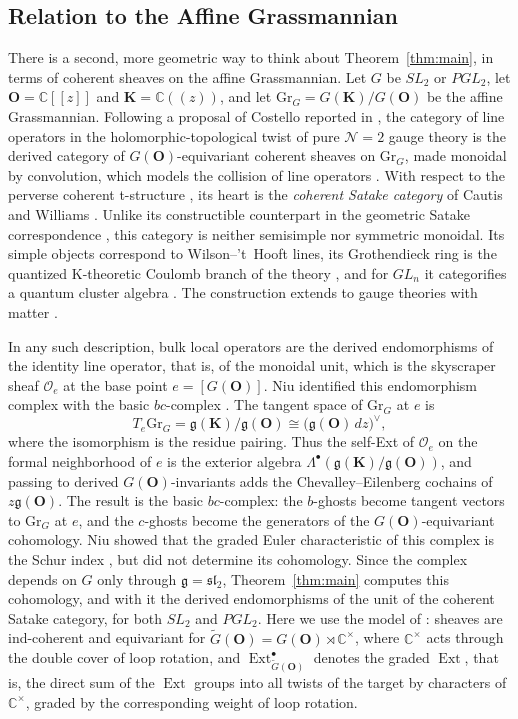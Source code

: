 \documentclass[11pt]{amsart}
\numberwithin{equation}{section}
\renewcommand{\S}{\mbox{$\mathsection$}}
\theoremstyle{definition}
\theoremstyle{remark}
\newcommand{\C}{\mathbb{C}}
\newcommand{\g}{\mathfrak{g}}
\newcommand{\sltwo}{\mathfrak{sl}_2}
\newcommand{\cO}{\mathcal{O}}
\newcommand{\bO}{\mathbf{O}}
\newcommand{\bK}{\mathbf{K}}
\newcommand{\Gr}{\mathrm{Gr}}
\newcommand{\Ext}{\operatorname{Ext}}
\begin{document}
\subsection{Relation to the Affine Grassmannian}\label{subsec:Gr}
There is a second, more geometric way to think about Theorem~\ref{thm:main}, in terms of coherent sheaves on the affine Grassmannian. Let $G$ be $SL_2$ or $PGL_2$, let $\bO=\C[[z]]$ and $\bK=\C((z))$, and let $\Gr_G=G(\bK)/G(\bO)$ be the affine Grassmannian. Following a proposal of Costello reported in \cite{CW19}, the category of line operators in the holomorphic-topological twist \cite{Kap06} of pure $\mathcal N=2$ gauge theory is the derived category of $G(\bO)$-equivariant coherent sheaves on $\Gr_G$, made monoidal by convolution, which models the collision of line operators \cite{KS09}. With respect to the perverse coherent t-structure \cite{AB10,BFM05}, its heart is the \emph{coherent Satake category} of Cautis and Williams \cite{CW19}. Unlike its constructible counterpart in the geometric Satake correspondence \cite{MV07}, this category is neither semisimple nor symmetric monoidal. Its simple objects correspond to Wilson--'t~Hooft lines, its Grothendieck ring is the quantized K-theoretic Coulomb branch of the theory \cite{BFM05,BFN18}, and for $GL_n$ it categorifies a quantum cluster algebra \cite{CW19}. The construction extends to gauge theories with matter \cite{CW23}.

In any such description, bulk local operators are the derived endomorphisms of the identity line operator, that is, of the monoidal unit, which is the skyscraper sheaf $\cO_e$ at the base point $e=[G(\bO)]$. Niu identified this endomorphism complex with the basic $bc$-complex \cite[Theorem~4.13]{Niu22}. The tangent space of $\Gr_G$ at $e$ is
\begin{equation}\label{eq:tangent}
T_e\Gr_G=\g(\bK)/\g(\bO)\cong\bigl(\g(\bO)\,dz\bigr)^\vee,
\end{equation}
where the isomorphism is the residue pairing. Thus the self-Ext of $\cO_e$ on the formal neighborhood of $e$ is the exterior algebra $\Lambda^\bullet(\g(\bK)/\g(\bO))$, and passing to derived $G(\bO)$-invariants adds the Chevalley--Eilenberg cochains of $z\g(\bO)$. The result is the basic $bc$-complex: the $b$-ghosts become tangent vectors to $\Gr_G$ at $e$, and the $c$-ghosts become the generators of the $G(\bO)$-equivariant cohomology. Niu showed that the graded Euler characteristic of this complex is the Schur index \cite{Niu22}, but did not determine its cohomology. Since the complex depends on $G$ only through $\g=\sltwo$, Theorem~\ref{thm:main} computes this cohomology, and with it the derived endomorphisms of the unit of the coherent Satake category, for both $SL_2$ and $PGL_2$. Here we use the model of \cite[\S4]{Niu22}: sheaves are ind-coherent and equivariant for $\widetilde G(\bO)=G(\bO)\rtimes\C^\times$, where $\C^\times$ acts through the double cover of loop rotation, and $\Ext^\bullet_{\widetilde G(\bO)}$ denotes the graded $\Ext$, that is, the direct sum of the $\Ext$ groups into all twists of the target by characters of $\C^\times$, graded by the corresponding weight of loop rotation.
\end{document}
